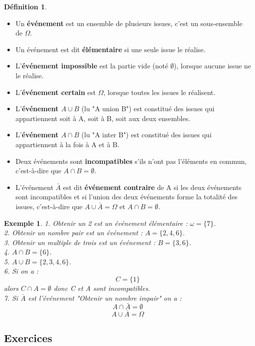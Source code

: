 \documentclass[a4paper,12pt,final]{article}
\newtheorem{Ex}{Exemple}[section]
\theoremstyle{theorem}
\theoremstyle{definition}
\theoremstyle{definition}
\theoremstyle{definition}
\newtheorem{Def}{Définition}[section]
\begin{document}
		\begin{Def}
			\begin{itemize}
				\item Un \textbf{événement} est un ensemble de plusieurs issues, c'est un sous-ensemble de $\Omega$.
				\item Un événement est dit \textbf{élémentaire} si une seule issue le réalise.
				\item L'\textbf{événement impossible} est la partie vide (noté $\emptyset$), lorsque aucune issue ne le réalise.
				\item L'\textbf{événement certain} est $\Omega$, lorsque toutes les issues le réalisent.
				\item L'\textbf{événement $A\cup B$} (lu "A union B") est constitué des issues qui appartiennent soit à A, soit à B, soit aux deux ensembles.
				\item L'\textbf{événement $A\cap B$} (lu "A inter B") est constitué des issues qui appartiennent à la fois à A et à B.
				\item Deux événements sont \textbf{incompatibles} s'ils n'ont pas l'éléments en commun, c'est-à-dire que $A\cap B = \emptyset$.
				\item L'événement $\bar{A}$ est dit \textbf{événement contraire} de A si les deux événements sont incompatibles et si l'union des deux événements forme la totalité des issues, c'est-à-dire que $A\cup \bar{A} = \Omega$ et $A\cap B = \emptyset$.
			\end{itemize}		
		\end{Def}

		\begin{Ex}
			1. Obtenir un 2 est un événement élémentaire : $\omega = \{7\}$. \\
			2. Obtenir un nombre pair est un événement : $A = \{2,4,6\}$. \\
			3. Obtenir un multiple de trois est un événement : $B = \{3,6\}$. \\
			4. $A\cap B = \{6\}$. \\
			5. $A\cup B = \{2,3,4,6\}$. \\
			6. Si on a : \[C = \{1\}\] alors $C\cap A = \emptyset$ donc C et A sont incompatibles. \\
			7. Si $\bar{A}$ est l'événement "Obtenir un nombre impair" on a : \[A\cap \bar{A} = \emptyset\]
			\[A\cup \bar{A} = \Omega\]
			
		\end{Ex}
	
		\subsection{Exercices}
			
\end{document}
